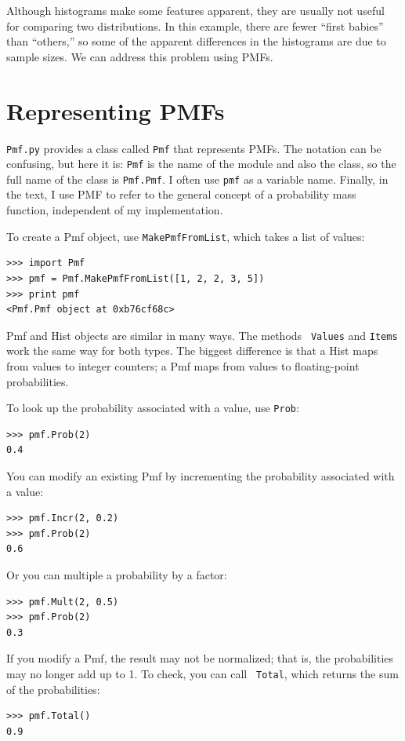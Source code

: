 \documentclass[12pt]{book}
\begin{document}
Although histograms make some features apparent, they are usually not
useful for comparing two distributions.  In this example, there are
fewer ``first babies'' than ``others,'' so some of the apparent
differences in the histograms are due to sample sizes.  We can
address this problem using PMFs.


\section{Representing PMFs}

{\tt Pmf.py} provides a class called {\tt Pmf} that represents PMFs.
The notation can be confusing, but here it is: {\tt Pmf} is the
name of the module and also the class, so the full name of the class
is {\tt Pmf.Pmf}.  I often use {\tt pmf} as a variable name.
Finally, in the text, I use PMF to refer to the general concept
of a probability mass function, independent of my implementation.

To create a Pmf object, use {\tt MakePmfFromList}, which takes a list
of values:
%
\begin{verbatim}
>>> import Pmf
>>> pmf = Pmf.MakePmfFromList([1, 2, 2, 3, 5])
>>> print pmf
<Pmf.Pmf object at 0xb76cf68c>
\end{verbatim}

Pmf and Hist objects are similar in many ways.  The methods {\tt
  Values} and {\tt Items} work the same way for both types.  The
biggest difference is that a Hist maps from values to integer
counters; a Pmf maps from values to floating-point probabilities.

To look up the probability associated with a value, use {\tt Prob}:
%
\begin{verbatim}
>>> pmf.Prob(2)
0.4
\end{verbatim}

You can modify an existing Pmf by incrementing the probability
associated with a value:
%
\begin{verbatim}
>>> pmf.Incr(2, 0.2)
>>> pmf.Prob(2)
0.6
\end{verbatim}

Or you can multiple a probability by a factor:
%
\begin{verbatim}
>>> pmf.Mult(2, 0.5)
>>> pmf.Prob(2)
0.3
\end{verbatim}

If you modify a Pmf, the result may not be normalized; that is, the
probabilities may no longer add up to 1.  To check, you can call {\tt
  Total}, which returns the sum of the probabilities:
%
\begin{verbatim}
>>> pmf.Total()
0.9
\end{verbatim}
\end{document}
